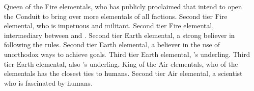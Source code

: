 \documentclass[blue]{elementals}
\begin{document}
\begin{members}
  \member{\cQueen{}} Queen of the Fire elementals, who has publicly proclaimed that \cQueen{\they} intend to open the Conduit to bring over more elementals of all factions.
  \member{\cPyro{}} Second tier Fire elemental, who is impetuous and militant.
  \member{\cJuliet{}} Second tier Fire elemental, intermediary between \cQueen{} and \cKing{}.
  \member{\cLoyal{}} Second tier Earth elemental, a strong believer in following the rules.
  \member{\cRogue{}} Second tier Earth elemental, a believer in the use of unorthodox ways to achieve goals.
  \member{\cMinion{}} Third tier Earth elemental, \cLoyal{}'s underling.
  \member{\cMiniEarth{}} Third tier Earth elemental, also \cLoyal{}'s underling.
  \member{\cKing{}} King of the Air elementals, who of the elementals has the closest ties to humans.
  \member{\cNaturalist{}} Second tier Air elemental, a scientist who is fascinated by humans.
\end{members}
\end{document}
